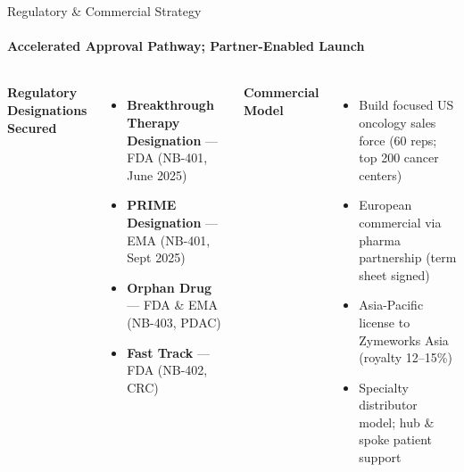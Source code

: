 \documentclass[aspectratio=169,10pt]{beamer}
\begin{document}
\begin{frame}{Regulatory \& Commercial Strategy}
  \framesubtitle{Accelerated Approval Pathway; Partner-Enabled Launch}
  \begin{columns}[T,onlytextwidth]
    \small
    {\color{NavyLight}\bfseries Regulatory Designations Secured}
    \vspace{4pt}
    \begin{itemize}\setlength\itemsep{4pt}
      \item[\textcolor{GoldAccent}{\faStar}]
        \textbf{Breakthrough Therapy Designation} --- FDA (NB-401, June 2025)
      \item[\textcolor{GoldAccent}{\faStar}]
        \textbf{PRIME Designation} --- EMA (NB-401, Sept 2025)
      \item[\textcolor{TealAccent}{\faCheck}]
        \textbf{Orphan Drug} --- FDA \& EMA (NB-403, PDAC)
      \item[\textcolor{TealAccent}{\faCheck}]
        \textbf{Fast Track} --- FDA (NB-402, CRC)
    \end{itemize}
    \vspace{8pt}
    {\color{NavyLight}\bfseries Commercial Model}
    \vspace{4pt}
    \begin{itemize}\setlength\itemsep{4pt}
      \item Build focused US oncology sales force (60 reps; top 200 cancer centers)
      \item European commercial via pharma partnership (term sheet signed)
      \item Asia-Pacific license to Zymeworks Asia (royalty 12--15\%)
      \item Specialty distributor model; hub \& spoke patient support
    \end{itemize}


\end{columns}
\end{frame}
\end{document}

